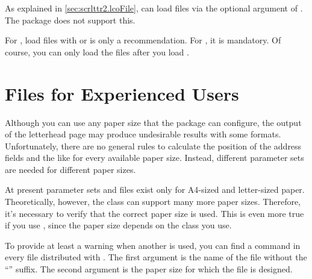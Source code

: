 As explained in
\autoref{sec:scrlttr2.lcoFile},  can load  files via
the optional argument of . The  package
does not support this.

\begin{Declaration}
\end{Declaration}
For , load  files with
 or
 is only a recommendation. For
, it is mandatory. Of course, you can only load the
 files after you load .
%
\EndIndexGroup
%
\EndIndexGroup
\fi


\section{ Files for Experienced Users}
\BeginIndexGroup
{}

\BeginIndexGroup%
%
Although you can use any paper size that the
\hyperref[cha:typearea]{}%
 package can configure, the output of the letterhead
page may produce undesirable results with some formats. Unfortunately, there
are no general rules to calculate the position of the address fields and the
like for every available paper size. Instead, different parameter sets are
needed for different paper sizes.%


At present parameter sets and  files exist only for A4-sized and
letter-sized paper. Theoretically, however, the  class can
support many more paper sizes. Therefore, it's necessary to verify that the
correct paper size is used. This is even more true if you use
, since the paper size depends on the class you use.

\begin{Declaration}
\end{Declaration}
To provide at least a warning when another  is used, you can
find a  command in every  file
distributed with {\KOMAScript}. The first argument is the name of the
 file without the ``'' suffix. The second argument is the
paper size for which the  file is designed.

